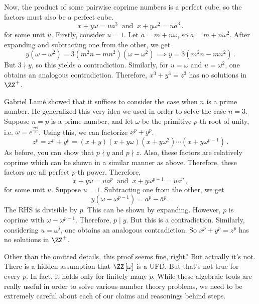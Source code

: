 \documentclass[11pt]{scrartcl}
\begin{document}
Now, the product of some pairwise coprime numbers is a perfect cube, so the factors must also be a perfect cube.
\[ x+y\omega = u a^3 \ \text{ and } \ x+y\omega^2 = \bar u \bar a ^3 \,. \]
for some unit \(u\). Firstly, consider \(u = 1\). Let \(a = m+n \omega\), so \(\bar a = m+n \omega^2 \). After expanding and subtracting one from the other, we get
\[ y \left(\omega - \omega^2\right) = 3 \left(m^2n-mn^2\right)  \left(\omega - \omega^2\right) \implies y =  3 \left(m^2n-mn^2\right)  \,.\]
But \(3 \nmid y\), so this yields a contradiction. Similarly, for \(u = \omega\) and \(u = \omega^2\), one obtains an analogous contradiction. Therefore, \(x^3+y^3=z^3\) has no solutions in \(\ZZ^+\).

Gabriel Lamé showed that it suffices to consider the case when \(n\) is a prime number. He generalized this very idea we used in order to solve the case \(n=3\). Suppose \(n=p\) is a prime number, and let \(\omega\) be the primitive \(p\)-th root of unity, i.e. \(\omega = e^{\frac{2\pi i}{p}}\). Using this, we can factorize \(x^p + y^p\).
\[ z^ p = x^p + y^p = \left(x+y\right) \left(x+y \omega\right) \left(x+y \omega ^2\right) \cdots \left(x+y \omega^{p-1}\right) \,. \]
As before, you can show that \(p \nmid y\) and \(p \nmid z\). Also, these factors are relatively coprime which can be shown in a similar manner as above. Therefore, these factors are all perfect \(p\)-th power. Therefore,
\[ x+y \omega = u a^p \ \text{ and } \  x+y \omega^{p-1} =\bar u \bar a ^p \,, \]
for some unit \(u\). Suppose \(u = 1\). Subtracting one from the other, we get
\[ y \left(\omega - \omega^{p-1}\right) = a^p - \bar a ^p \,. \]
The RHS is divisible by \(p\). This can be shown by expanding. However, \(p\) is coprime with \(\omega - \omega^{p-1}\). Therefore, \(p \mid y\). But this is a contradiction. Similarly, considering \(u = \omega^i\), one obtains an analogous contradiction. So \(x^p + y^p = z^p\) has no solutions in \(\ZZ^+\).

\vspace{3mm}

Other than the omitted details, this proof seems fine, right? But actually it's not. There is a hidden assumption that \(\ZZ \left[\omega\right] \) is a UFD. But that's not true for every \(p\). In fact, it holds only for finitely many \(p\). While these algebraic tools are really useful in order to solve various number theory problems, we need to be extremely careful about each of our claims and reasonings behind steps.
\end{document}

